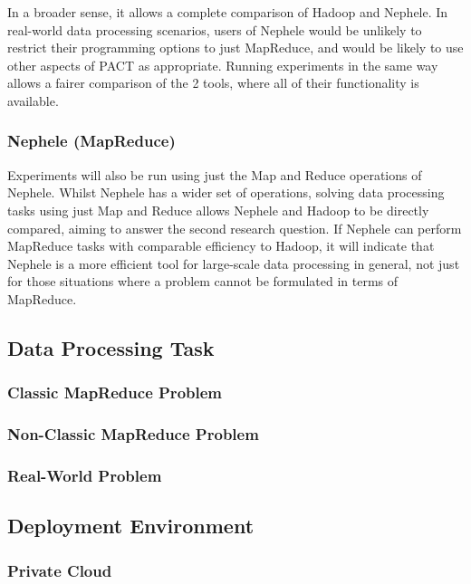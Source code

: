 In a broader sense, it allows a complete comparison of Hadoop and Nephele. In real-world data processing scenarios, users of Nephele would be unlikely to restrict their programming options to just MapReduce, and would be likely to use other aspects of PACT as appropriate. Running experiments in the same way allows a fairer comparison of the 2 tools, where all of their functionality is available.

\subsubsection{Nephele (MapReduce)}
Experiments will also be run using just the Map and Reduce operations of Nephele. Whilst Nephele has a wider set of operations, solving data processing tasks using just Map and Reduce allows Nephele and Hadoop to be directly compared, aiming to answer the second research question. If Nephele can perform MapReduce tasks with comparable efficiency to Hadoop, it will indicate that Nephele is a more efficient tool for large-scale data processing in general, not just for those situations where a problem cannot be formulated in terms of MapReduce.

\subsection{Data Processing Task}

\subsubsection{Classic MapReduce Problem}

\subsubsection{Non-Classic MapReduce Problem}

\subsubsection{Real-World Problem}

\subsection{Deployment Environment}

\subsubsection{Private Cloud}

